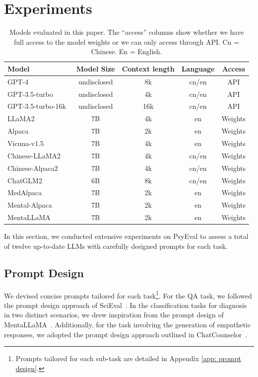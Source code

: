 
\section{Experiments}
\begin{table}[t!]
\centering
\footnotesize
\begin{tabular}{l c c c c}
\hline
\textbf{Model} & \textbf{Model Size} & \textbf{Context length} & \textbf{Language} & \textbf{Access}\\
\hline
GPT-4~\citep{openai2023gpt4} & undisclosed & 8k & cn/en & API \\
GPT-3.5-turbo~\citep{schulman2022chatgpt} & undisclosed & 4k & cn/en & API\\
GPT-3.5-turbo-16k~\citep{schulman2022chatgpt} & undisclosed & 16k & cn/en & API\\
\hline
LLaMA2~\citep{touvron2023llama} & 7B & 4k & en & Weights\\
Alpaca~\citep{alpaca} & 7B & 2k & en & Weights\\
Vicuna-v1.5~\citep{chiang2023vicuna} & 7B & 4k & en & Weights\\
\hline
Chinese-LLaMA2~\citep{Chinese-LLaMA-Alpaca} & 7B & 4k & cn/en & Weights\\
Chinese-Alpaca2~\citep{Chinese-LLaMA-Alpaca} & 7B & 4k & cn/en & Weights\\
ChatGLM2~\citep{du2022glm, zeng2022glm} & 6B & 8k & cn/en & Weights\\
\hline
MedAlpaca~\citep{han2023medalpaca} & 7B & 2k & en & Weights\\
Mental-Alpaca~\citep{xu2023leveraging} & 7B & 2k & en & Weights\\
MentaLLaMA~\citep{yang2023mentallama} & 7B & 2k & en & Weights\\
\hline
\end{tabular}
\caption{Models evaluated in this paper. The “access” columns show whether we have full access to the model weights or we can only access through API. Cn = Chinese. En = English.} 
\label{tab:models}
\end{table}
In this section, we conducted extensive experiments on PsyEval to assess a total of twelve up-to-date LLMs with carefully designed prompts for each task.

\subsection{Prompt Design}
We devised concise prompts tailored for each task\footnote{Prompts tailored for each sub-task are detailed in Appendix \ref{app: prompt design}.}. For the QA task, we followed the prompt design approach of SciEval~\citep{sun2023scieval}. In the classification tasks for diagnosis in two distinct scenarios, we drew inspiration from the prompt design of MentaLLaMA~\citep{yang2023mentallama}. Additionally, for the task involving the generation of empathetic responses, we adopted the prompt design approach outlined in ChatCounselor~\citep{liu2023chatcounselor}.  

